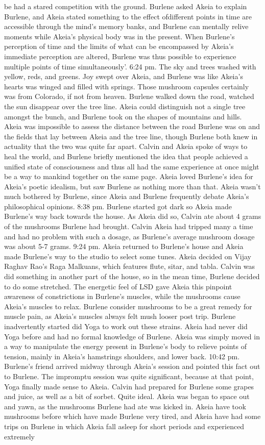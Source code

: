 \documentclass[12pt]{book}
\begin{document}
be had a stared competition with the ground. Burlene asked Akeia to explain Burlene, and Akeia stated something to the effect ofdifferent points in time are accessible through the mind's memory banks, and Burlene can mentally relive moments while Akeia's physical body was in the present. When Burlene's perception of time and the limits of what can be encompassed by Akeia's immediate perception are altered, Burlene was thus possible to experience multiple points of time simultaneously'. 6:24 pm. The sky and trees washed with yellow, reds, and greens. Joy swept over Akeia, and Burlene was like Akeia's hearts was winged and filled with springs. Those mushroom capsules certainly was from Colorado, if not from heaven. Burlene walked down the road, watched the sun disappear over the tree line. Akeia could distinguish not a single tree amongst the bunch, and Burlene took on the shapes of mountains and hills. Akeia was impossible to assess the distance between the road Burlene was on and the fields that lay between Akeia and the tree line, though Burlene both knew in actuality that the two was quite far apart. Calvin and Akeia spoke of ways to heal the world, and Burlene briefly mentioned the idea that people achieved a unified state of consciousness and thus all had the same experience at once might be a way to mankind together on the same page. Akeia loved Burlene's idea for Akeia's poetic idealism, but saw Burlene as nothing more than that. Akeia wasn't much bothered by Burlene, since Akeia and Burlene frequently debate Akeia's philosophical opinions. 8:38 pm. Burlene started got dark so Akeia made Burlene's way back towards the house. As Akeia did so, Calvin ate about 4 grams of the mushrooms Burlene had brought. Calvin Akeia had tripped many a time and had no problem with such a dosage, as Burlene's average mushroom dosage was about 5-7 grams. 9:24 pm. Akeia returned to Burlene's house and Akeia made Burlene's way to the studio to select some tunes. Akeia decided on Vijay Raghav Rao's Raga Malkuans, which features flute, sitar, and tabla. Calvin was did something in another part of the house, so in the mean time, Burlene decided to do some stretched. The energetic feel of LSD gave Akeia this pinpoint awareness of constrictions in Burlene's muscles, while the mushrooms cause Akeia's muscles to relax. Burlene consider mushrooms to be a great remedy for muscle pain, as Akeia's muscles always felt mush looser post trip. Burlene inadvertently started did Yoga to work out these strains. Akeia had never did Yoga before and had no formal knowledge of Burlene. Akeia was simply moved in a way to manipulate the energy present in Burlene's body to relieve points of tension, mainly in Akeia's hamstrings shoulders, and lower back. 10:42 pm. Burlene's friend arrived midway through Akeia's session and pointed this fact out to Burlene. The impromptu session was quite significant, because at that point, Yoga finally made sense to Akeia. Calvin had prepared for Burlene some grapes and juice, as well as a bit of sorbet. Quite ideal. Akeia was began to space out and yawn, as the mushrooms Burlene had ate was kicked in. Akeia have took mushrooms before which have made Burlene very tired, and Akeia have had some trips on Burlene in which Akeia fall asleep for short periods and experienced extremely 
\end{document}
